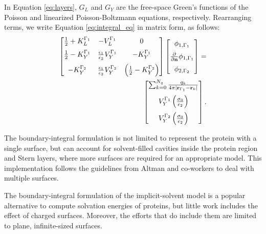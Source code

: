 \noindent In Equation \eqref{eq:layers}, $G_L$ and $G_Y$ are the free-space Green's functions of the Poisson and linearized Poisson-Boltzmann equations, respectively. 
Rearranging terms, we write Equation \eqref{eq:integral_eq} in matrix form, as follows:
%
 \begin{align} \label{eq:matrix_dphi}
 \left[
    \begin{matrix} %
       \frac{1}{2} + K_{L}^{\Gamma_1} & -V_{L}^{\Gamma_1} & 0 \vspace{0.2cm}\\
       \frac{1}{2} - K_{Y}^{\Gamma_1} &  \frac{\epsilon_1}{\epsilon_2} V_{Y}^{\Gamma_1} & -K_{Y}^{\Gamma_1} \vspace{0.2cm} \\
       - K_{Y}^{\Gamma_2} & \frac{\epsilon_1}{\epsilon_2} V_{Y}^{\Gamma_2} & \left(\frac{1}{2} - K_{Y}^{\Gamma_2}\right) \\
    \end{matrix}
    \right] \left[ 
    \begin{matrix} %
       \phi_{1,\Gamma_1} \vspace{0.2cm} \\
       \frac{\partial}{\partial \mathbf{n}} \phi_{1,\Gamma_1} \vspace{0.2cm}\\
       \phi_{2,\Gamma_2}\\
    \end{matrix} 
     \right] =   \nonumber \\
    \left[
    \begin{matrix} %
       \sum_{k=0}^{N_q} \frac{q_k}{4\pi|\mathbf{r}_{\Gamma_1} - \mathbf{r}_k|} \vspace{0.2cm} \\
        V_{Y}^{\Gamma_1} \left( \frac{\sigma_0}{\epsilon_2} \right) \vspace{0.2cm} \\
        V_{Y}^{\Gamma_2} \left( \frac{\sigma_0}{\epsilon_2} \right)
    \end{matrix}
    \right].
 \end{align}

The boundary-integral formulation is not limited to represent the protein with a single surface, but can account for solvent-filled cavities inside the protein region and Stern layers,\cite{CooperBardhanBarba2013} where more surfaces are required for an appropriate model. This implementation follows the guidelines from Altman and co-workers to deal with multiple surfaces.

The boundary-integral formulation of the implicit-solvent model is a popular alternative to compute solvation energies of proteins,\cite{YoonLenhoff1990, Juffer1991a, LuETal2006, BajajETal2011, AltmanBardhanWhiteTidor09, GengKrasny2013, CooperBardhanBarba2013} but little work includes the effect of charged surfaces. Moreover, the efforts that do include them\cite{YoonLenhoff1992} are limited to plane, infinite-sized surfaces. 
